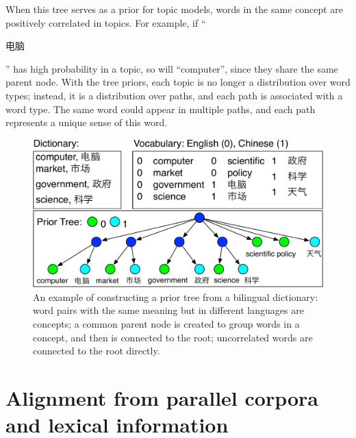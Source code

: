 
When this tree serves as a prior for topic models, words in the same
concept are positively correlated in topics.  For example, if
``\begin{CJK*}{UTF8}{gbsn}电脑\end{CJK*}'' has high probability in a
  topic, so will ``computer'', since they share the same parent
  node. With the tree priors, each topic is no longer a distribution
  over word types; instead, it is a distribution over paths, and each
  path is associated with a word type.  The same word could appear in
  multiple paths, and each path represents a unique sense of this
  word.

\begin{figure}
\centering
\includegraphics[width=0.9\linewidth]{figures/correlations_tree-crop.pdf}
\vspace{-3mm}
\caption[Constructing prior tree from a bilingual dictionary]{An example of constructing a prior tree from a
  bilingual dictionary: word pairs with the same meaning but in
  different languages are concepts; a common parent node is created to
  group words in a concept, and then is connected to the root;
  uncorrelated words are connected to the root directly.}
\label{fig:prior_trees}
\end{figure}


\section{Alignment from parallel corpora and lexical information}

